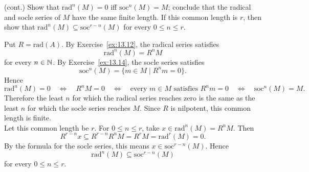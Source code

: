 \documentclass[../Odyssey_Project.tex]{subfiles}
\begin{document}
\begin{exercise}
\label{ex:13.15}
(cont.) Show that $\mathrm{rad}^n(M) = 0$ iff $\mathrm{soc}^n(M) = M$; conclude that the radical and socle series of $M$ have the same finite length. If this common length is $r$, then show that $\mathrm{rad}^n(M) \subseteq \mathrm{soc}^{r-n}(M)$ for every $0 \leq n \leq r$.
\end{exercise}
\begin{solution}
    Put $R=\mathrm{rad}(A)$. By Exercise~\ref{ex:13.12}, the radical series satisfies
    \[
        \mathrm{rad}^n(M)=R^nM
    \]
    for every $n\in\mathbb{N}$. By Exercise~\ref{ex:13.14}, the socle series satisfies
    \[
        \mathrm{soc}^n(M)=\{m\in M\mid R^n m=0\}.
    \]
    Hence
    \[
        \mathrm{rad}^n(M)=0
        \quad\Longleftrightarrow\quad
        R^nM=0
        \quad\Longleftrightarrow\quad
        \text{every }m\in M\text{ satisfies }R^n m=0
        \quad\Longleftrightarrow\quad
        \mathrm{soc}^n(M)=M.
    \]
    Therefore the least $n$ for which the radical series reaches zero is the same as the least $n$ for which the socle series reaches $M$. Since $R$ is nilpotent, this common length is finite.\\
    Let this common length be $r$. For $0\leq n\leq r$, take $x\in\mathrm{rad}^n(M)=R^nM$. Then
    \[
        R^{r-n}x\subseteq R^{r-n}R^nM=R^rM=\mathrm{rad}^r(M)=0.
    \]
    By the formula for the socle series, this means $x\in \mathrm{soc}^{r-n}(M)$. Hence
    \[
        \mathrm{rad}^n(M)\subseteq \mathrm{soc}^{r-n}(M)
    \]
    for every $0\leq n\leq r$.
\end{solution}
\end{document}
